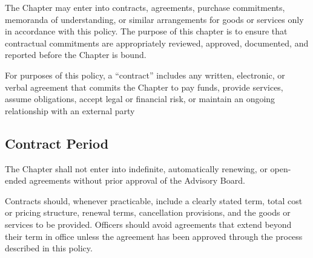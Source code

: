 The Chapter may enter into contracts, agreements, purchase commitments, memoranda of understanding, or similar arrangements for goods or services only in accordance with this policy. 
The purpose of this chapter is to ensure that contractual commitments are appropriately reviewed, approved, documented, and reported before the Chapter is bound.

For purposes of this policy, a “contract” includes any written, electronic, or verbal agreement that commits the Chapter to pay funds, provide services, assume obligations, 
accept legal or financial risk, or maintain an ongoing relationship with an external party

\subsection{Contract Period} \label{XIII.1}
The Chapter shall not enter into indefinite, automatically renewing, or open-ended agreements without prior approval of the Advisory Board.

Contracts should, whenever practicable, include a clearly stated term, total cost or pricing structure, renewal terms, cancellation provisions, and the goods or services to be provided. 
Officers should avoid agreements that extend beyond their term in office unless the agreement has been approved through the process described in this policy.

